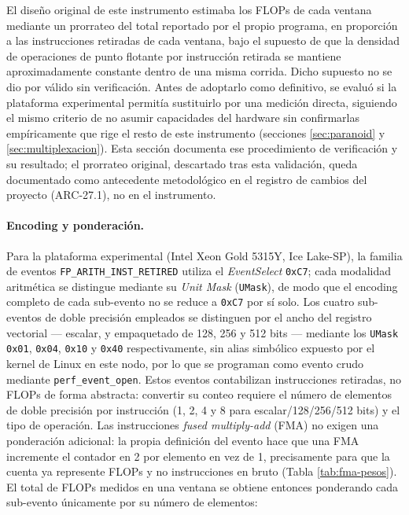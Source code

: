 \documentclass[12pt,oneside,spanish]{book}
\begin{document}
El diseño original de este instrumento estimaba los FLOPs de cada ventana mediante un prorrateo del total reportado por el propio programa, en proporción a las instrucciones retiradas de cada ventana, bajo el supuesto de que la densidad de operaciones de punto flotante por instrucción retirada se mantiene aproximadamente constante dentro de una misma corrida. Dicho supuesto no se dio por válido sin verificación. Antes de adoptarlo como definitivo, se evaluó si la plataforma experimental permitía sustituirlo por una medición directa, siguiendo el mismo criterio de no asumir capacidades del hardware sin confirmarlas empíricamente que rige el resto de este instrumento (secciones \ref{sec:paranoid} y \ref{sec:multiplexacion}). Esta sección documenta ese procedimiento de verificación y su resultado; el prorrateo original, descartado tras esta validación, queda documentado como antecedente metodológico en el registro de cambios del proyecto (ARC-27.1), no en el instrumento.

\paragraph{Encoding y ponderación.} Para la plataforma experimental (Intel Xeon Gold 5315Y, Ice Lake-SP), la familia de eventos \texttt{FP\_ARITH\_INST\_RETIRED} utiliza el \textit{EventSelect} \texttt{0xC7}; cada modalidad aritmética se distingue mediante su \textit{Unit Mask} (\texttt{UMask}), de modo que el encoding completo de cada sub-evento no se reduce a \texttt{0xC7} por sí solo. Los cuatro sub-eventos de doble precisión empleados se distinguen por el ancho del registro vectorial --- escalar, y empaquetado de 128, 256 y 512 bits --- mediante los \texttt{UMask} \texttt{0x01}, \texttt{0x04}, \texttt{0x10} y \texttt{0x40} respectivamente, sin alias simbólico expuesto por el kernel de Linux en este nodo, por lo que se programan como evento crudo mediante \texttt{perf\_event\_open}. Estos eventos contabilizan instrucciones retiradas, no FLOPs de forma abstracta: convertir su conteo requiere el número de elementos de doble precisión por instrucción (1, 2, 4 y 8 para escalar/128/256/512 bits) y el tipo de operación. Las instrucciones \textit{fused multiply-add} (FMA) no exigen una ponderación adicional: la propia definición del evento hace que una FMA incremente el contador en 2 por elemento en vez de 1, precisamente para que la cuenta ya represente FLOPs y no instrucciones en bruto \cite{IntelPerfmon2026} (Tabla \ref{tab:fma-pesos}). El total de FLOPs medidos en una ventana se obtiene entonces ponderando cada sub-evento únicamente por su número de elementos:
\end{document}
